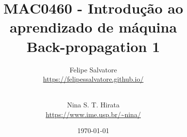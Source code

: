 \title{MAC0460 - Introdução ao aprendizado de máquina \\ \vspace{0.2 cm} Back-propagation 1} 
\date{\today}

\author{
  Felipe Salvatore\\
  \url{https://felipessalvatore.github.io/}\vspace{0.4 cm}
  \and\\ 
  Nina S. T. Hirata\\
  \url{https://www.ime.usp.br/~nina/}
  \vspace{0.4 cm}
}



